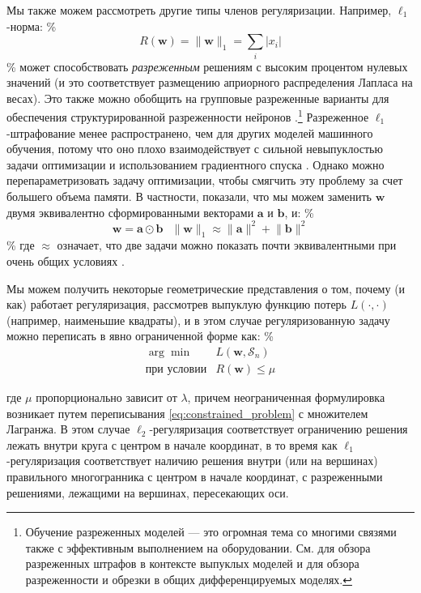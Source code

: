 Мы также можем рассмотреть другие типы членов регуляризации. Например, $\ell_1$-норма:
\%
$$
R(\mathbf{w})=\lVert \mathbf{w} \rVert_1=\sum_i \lvert x_i \rvert
$$
\%
может способствовать \textit{разреженным} решениям с высоким процентом нулевых значений (и это соответствует размещению априорного распределения Лапласа на весах). Это также можно обобщить на групповые разреженные варианты для обеспечения структурированной разреженности нейронов \cite{scardapane2017group}.\footnote{Обучение разреженных моделей — это огромная тема со многими связями также с эффективным выполнением на оборудовании. См. \cite{bach2012optimization} для обзора разреженных штрафов в контексте выпуклых моделей и \cite{hoefler2021sparsity} для обзора разреженности и обрезки в общих дифференцируемых моделях.}  Разреженное $\ell_1$-штрафование менее распространено, чем для других моделей машинного обучения, потому что оно плохо взаимодействует с сильной невыпуклостью задачи оптимизации и использованием градиентного спуска \cite{ziyin2023spred}. Однако можно перепараметризовать задачу оптимизации, чтобы смягчить эту проблему за счет большего объема памяти. В частности, \cite{ziyin2023spred}  показали, что мы можем заменить $\mathbf{w}$ двумя эквивалентно сформированными векторами $\mathbf{a}$ и $\mathbf{b}$, и:
\%
\begin{equation}
\mathbf{w} = \mathbf{a} \odot \mathbf{b} \;\,\; \lVert \mathbf{w} \rVert_1 \approx \lVert \mathbf{a} \rVert^2 + \lVert \mathbf{b} \rVert^2
\end{equation}
\%
где $\approx$ означает, что две задачи можно показать почти эквивалентными при очень общих условиях \cite{ziyin2023spred}.

Мы можем получить некоторые геометрические представления о том, почему (и как) работает регуляризация, рассмотрев выпуклую функцию потерь $L(\cdot, \cdot)$ (например, наименьшие квадраты), и в этом случае регуляризованную задачу можно переписать в явно ограниченной форме как:
\%
\begin{equation}
\begin{matrix}\arg\min & L(\mathbf{w}, \mathcal{S}_n) \\ \text{при условии} & R(\mathbf{w})\le\mu \end{matrix}
\label{eq:constrained_problem}
\end{equation}

где $\mu$ пропорционально зависит от $\lambda$, причем неограниченная формулировка возникает путем переписывания \eqref{eq:constrained_problem} с множителем Лагранжа. В этом случае $\ell_2$-регуляризация соответствует ограничению решения лежать внутри круга с центром в начале координат, в то время как $\ell_1$-регуляризация соответствует наличию решения внутри (или на вершинах) правильного многогранника с центром в начале координат, с разреженными решениями, лежащими на вершинах, пересекающих оси.

